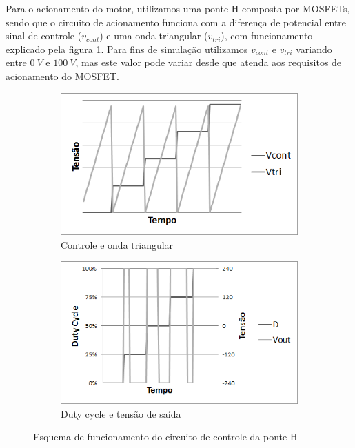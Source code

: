 \documentclass{article}
\begin{document}
Para o acionamento do motor, utilizamos uma ponte H composta por MOSFETs, sendo que o circuito de acionamento funciona com a diferença de potencial entre sinal de controle ($v_{cont}$) e uma onda triangular ($v_{tri}$), com funcionamento explicado pela figura \ref{fig:ponte}. Para fins de simulação utilizamos $v_{cont}$ e $v_{tri}$ variando entre $0\ V$ e $100\ V$, mas este valor pode variar desde que atenda aos requisitos de acionamento do MOSFET.

\begin{figure}[H]
	\centering
	\begin{subfigure}[t]{0.45\textwidth}
		\includegraphics[width=\linewidth]{ponte1}
		\caption{Controle e onda triangular}
	\end{subfigure}
	\begin{subfigure}[t]{0.45\textwidth}
		\includegraphics[width=\linewidth]{ponte2}
		\caption{Duty cycle e tensão de saída}
	\end{subfigure}
	\caption{Esquema de funcionamento do circuito de controle da ponte H}	
	\label{fig:ponte}
\end{figure}
\end{document}
